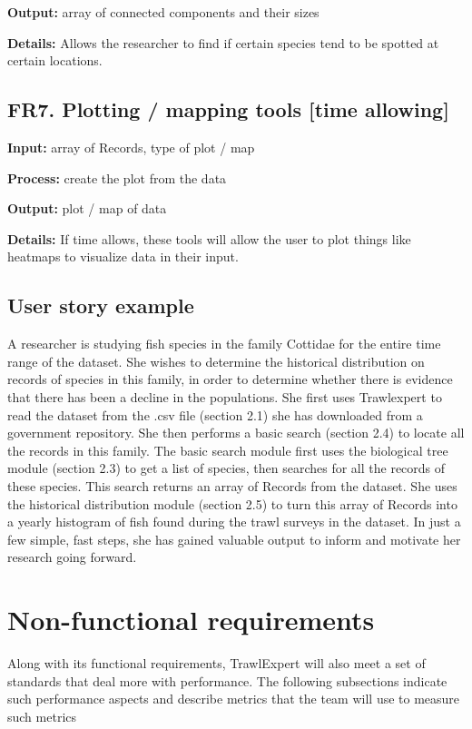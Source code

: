 \documentclass{article}
\begin{document}
\noindent \textbf{Output:} array of connected components and their sizes

\noindent \textbf{Details:} Allows the researcher to find if certain species tend to be spotted at certain locations.

\subsection{FR7. Plotting / mapping tools [time allowing]}
\noindent \textbf{Input:} array of Records, type of plot / map

\noindent \textbf{Process:} create the plot from the data

\noindent \textbf{Output:} plot / map of data

\noindent \textbf{Details:} If time allows, these tools will allow the user to plot things like heatmaps to visualize data in their input.

\subsection{User story example}
A researcher is studying fish species in the family Cottidae for the entire time range of the dataset. She wishes to determine the historical distribution on records of species in this family, in order to determine whether there is evidence that there has been a decline in the populations. 
She first uses Trawlexpert to read the dataset from the .csv file (section 2.1) she has downloaded from a government repository. She then performs a basic search (section 2.4) to locate all the records in this family. The basic search module first uses the biological tree module (section 2.3) to get a list of species, then searches for all the records of these species. This search returns an array of Records from the dataset. She uses the historical distribution module (section 2.5) to turn this array of Records into a yearly histogram of fish found during the trawl surveys in the dataset. In just a few simple, fast steps, she has gained valuable output to inform and motivate her research going forward.


\section{Non-functional requirements}
Along with its functional requirements, TrawlExpert will also meet a set of standards that deal more with performance. The following subsections indicate such performance aspects and describe metrics that the team will use to measure such metrics
\end{document}
